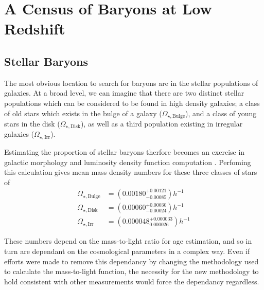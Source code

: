 \section{A Census of Baryons at Low Redshift}
\subsection{Stellar Baryons}
The most obvious location to search for baryons are in the stellar populations of galaxies. At a broad level, we can imagine that there are two distinct stellar populations which can be considered to be found in high density galaxies; a class of old stars which exists in the bulge of a galaxy ($\Omega_{\star,\text{Bulge}}$), and a class of young stars in the disk ($\Omega_{\star,\text{Disk}} $), as well as a third population existing in irregular galaxies ($\Omega_{\star,\text{Irr}}$).

\par Estimating the proportion of stellar baryons therfore becomes an exercise in galactic morphology and luminosity density function computation \citep{1998ApJ...503..518F}. Perfoming this calculation gives mean mass density numbers for these three classes of stars of
\begin{align*}
\Omega_{\star,\text{Bulge}} &= (0.00180^{+0.00121}_{-0.00085}) h^{-1} \\
\Omega_{\star,\text{Disk}} &= (0.00060^{+0.00030}_{-0.00024}) h^{-1} \\
\Omega_{\star,\text{Irr}} &= (0.000048^{+0.000033}_{0.000026}) h^{-1}
\end{align*}

These numbers depend on the mass-to-light ratio for age estimation, and so in turn are dependant on the cosmological parameters in a complex way. Even if efforts were made to remove this dependancy by changing the methodology used to calculate the mass-to-light function, the necessity for the new methodology to hold consistent with other measurements would force the dependancy regardless.


